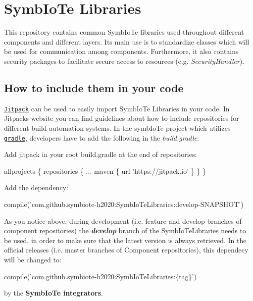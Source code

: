 \href{https://api.travis-ci.org/symbiote-h2020/SymbIoTeLibraries}{\tt } \href{https://jitpack.io/#symbiote-h2020/SymbIoTeLibraries}{\tt } \href{https://codecov.io/github/symbiote-h2020/SymbIoTeLibraries}{\tt } \section*{Symb\+Io\+Te Libraries}

This repository contains common Symb\+Io\+Te libraries used throughout different components and different layers. Its main use is to standardize classes which will be used for communication among components. Furthermore, it also contains security packages to facilitate secure access to resources (e.\+g. {\itshape Security\+Handler}). \subsection*{How to include them in your code}

\href{https://jitpack.io/}{\tt Jitpack} can be used to easily import Symb\+Io\+Te Libraries in your code. In Jitpack\textquotesingle{}s website you can find guidelines about how to include repositories for different build automation systems. In the symb\+Io\+Te project which utilizes \href{https://gradle.org/}{\tt gradle}, developers have to add the following in the {\itshape build.\+gradle}\+:


\begin{DoxyEnumerate}
\item Add jitpack in your root build.\+gradle at the end of repositories\+: 
\begin{DoxyCode}
allprojects \{
    repositories \{
        ...
        maven \{ url 'https://jitpack.io' \}
    \}
\}
\end{DoxyCode}

\item Add the dependency\+: 
\begin{DoxyCode}
compile('com.github.symbiote-h2020:SymbIoTeLibraries:develop-SNAPSHOT')
\end{DoxyCode}
 As you notice above, during development (i.\+e. feature and develop branches of component repositories) the {\itshape {\bfseries develop}} branch of the Symb\+Io\+Te\+Libraries needs to be used, in order to make sure that the latest version is always retrieved. In the official releases (i.\+e. master branches of Component repositories), this dependecy will be changed to\+:
\end{DoxyEnumerate}


\begin{DoxyCode}
compile('com.github.symbiote-h2020:SymbIoTeLibraries:\{tag\}')
\end{DoxyCode}
 by the {\bfseries Symb\+Io\+Te integrators}. 